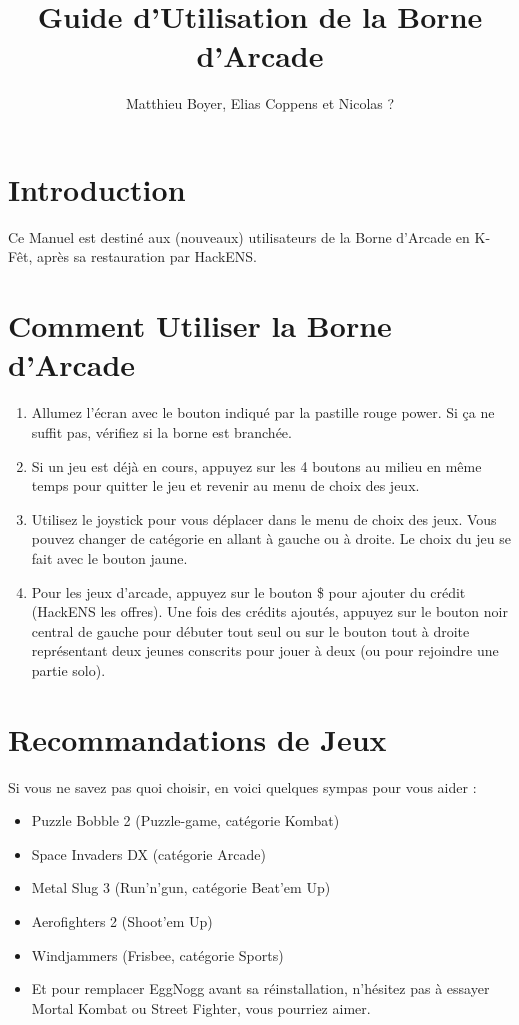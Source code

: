 \documentclass{article}
\title{Guide d'Utilisation de la Borne d'Arcade}
\author{Matthieu Boyer, Elias Coppens et Nicolas ?}
\date{}
\begin{document}
\maketitle
\section*{Introduction}
Ce Manuel est destiné aux (nouveaux) utilisateurs de la Borne d'Arcade en K-Fêt, après sa restauration par HackENS.

\section*{Comment Utiliser la Borne d'Arcade}
\begin{enumerate}
    \item Allumez l'écran avec le bouton indiqué par la pastille rouge power. Si ça ne suffit pas, vérifiez si la borne est branchée.
    \item Si un jeu est déjà en cours, appuyez sur les 4 boutons au milieu en même temps pour quitter le jeu et revenir au menu de choix des jeux.
    \item Utilisez le joystick pour vous déplacer dans le menu de choix des jeux. Vous pouvez changer de catégorie en allant à gauche ou à droite. Le choix du jeu se fait avec le bouton jaune.
    \item Pour les jeux d'arcade, appuyez sur le bouton \$ pour ajouter du crédit (HackENS les offres). Une fois des crédits ajoutés, appuyez sur le bouton noir central de gauche pour débuter tout seul ou sur le bouton tout à droite représentant deux jeunes conscrits pour jouer à deux (ou pour rejoindre une partie solo). 
\end{enumerate}

\section*{Recommandations de Jeux}
Si vous ne savez pas quoi choisir, en voici quelques sympas pour vous aider : 
\begin{itemize}
    \item Puzzle Bobble 2 (Puzzle-game, catégorie Kombat)
    \item Space Invaders DX (catégorie Arcade)
    \item Metal Slug 3 (Run'n'gun, catégorie Beat'em Up)
    \item Aerofighters 2 (Shoot'em Up)
    \item Windjammers (Frisbee, catégorie Sports)
    \item Et pour remplacer EggNogg avant sa réinstallation, n'hésitez pas à essayer Mortal Kombat ou Street Fighter, vous pourriez aimer. 
\end{itemize}
\end{document}
